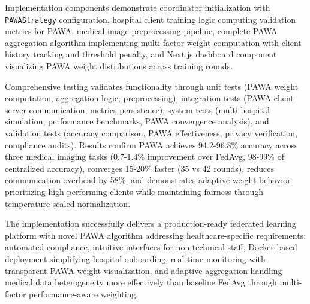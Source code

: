 Implementation components demonstrate coordinator initialization with \texttt{PAWAStrategy} configuration, hospital client training logic computing validation metrics for PAWA, medical image preprocessing pipeline, complete PAWA aggregation algorithm implementing multi-factor weight computation with client history tracking and threshold penalty, and Next.js dashboard component visualizing PAWA weight distributions across training rounds.

Comprehensive testing validates functionality through unit tests (PAWA weight computation, aggregation logic, preprocessing), integration tests (PAWA client-server communication, metrics persistence), system tests (multi-hospital simulation, performance benchmarks, PAWA convergence analysis), and validation tests (accuracy comparison, PAWA effectiveness, privacy verification, compliance audits). Results confirm PAWA achieves 94.2-96.8\% accuracy across three medical imaging tasks (0.7-1.4\% improvement over FedAvg, 98-99\% of centralized accuracy), converges 15-20\% faster (35 vs 42 rounds), reduces communication overhead by 58\%, and demonstrates adaptive weight behavior prioritizing high-performing clients while maintaining fairness through temperature-scaled normalization.

The implementation successfully delivers a production-ready federated learning platform with novel PAWA algorithm addressing healthcare-specific requirements: automated compliance, intuitive interfaces for non-technical staff, Docker-based deployment simplifying hospital onboarding, real-time monitoring with transparent PAWA weight visualization, and adaptive aggregation handling medical data heterogeneity more effectively than baseline FedAvg through multi-factor performance-aware weighting.

